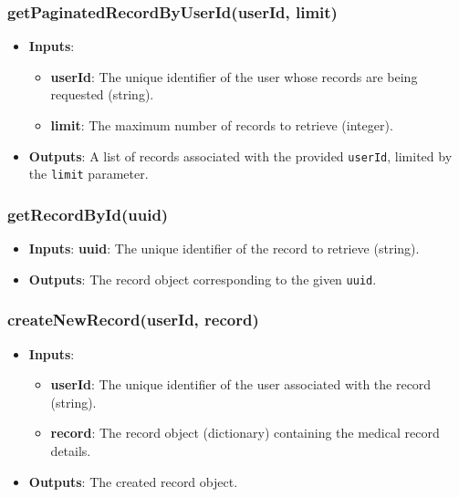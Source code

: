 \documentclass[12pt, titlepage]{article}
\begin{document}
\subsubsection{getPaginatedRecordByUserId(userId, limit)}
\begin{itemize}
    \item \textbf{Inputs}:
        \begin{itemize}
            \item \textbf{userId}: The unique identifier of the user whose records are being requested (string).
            \item \textbf{limit}: The maximum number of records to retrieve (integer).
        \end{itemize}
    \item \textbf{Outputs}: A list of records associated with the provided \texttt{userId}, limited by the \texttt{limit} parameter.
\end{itemize}

\subsubsection{getRecordById(uuid)}
\begin{itemize}
    \item \textbf{Inputs}: \textbf{uuid}: The unique identifier of the record to retrieve (string).
    \item \textbf{Outputs}: The record object corresponding to the given \texttt{uuid}.
\end{itemize}

\subsubsection{createNewRecord(userId, record)}
\begin{itemize}
    \item \textbf{Inputs}:
        \begin{itemize}
            \item \textbf{userId}: The unique identifier of the user associated with the record (string).
            \item \textbf{record}: The record object (dictionary) containing the medical record details.
        \end{itemize}
    \item \textbf{Outputs}: The created record object.
\end{itemize}
\end{document}
